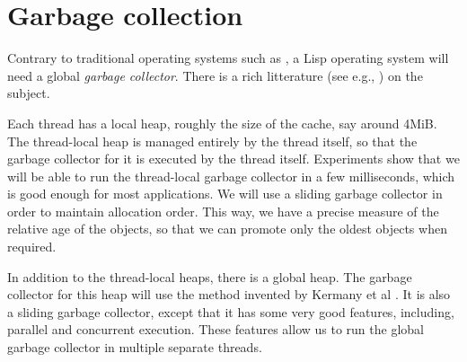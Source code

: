 \chapter{Garbage collection}
\label{chap-garbage-collection}

Contrary to traditional operating systems such as \unix{}, a Lisp
operating system will need a global \emph{garbage collector}.  There 
is a rich litterature (see e.g., \cite{Jones:2011:GCH:2025255}) on the
subject. 

Each thread has a local heap, roughly the size of the cache, say
around 4MiB.  The thread-local heap is managed entirely by the thread
itself, so that the garbage collector for it is executed by the thread
itself.  Experiments show that we will be able to run the thread-local
garbage collector in a few milliseconds, which is good enough for most
applications.  We will use a sliding garbage collector in order to
maintain allocation order.  This way, we have a precise measure of the
relative age of the objects, so that we can promote only the oldest
objects when required. 

In addition to the thread-local heaps, there is a global heap.  The
garbage collector for this heap will use the method invented by
Kermany et al \cite{Kermany:2006:CCI:1133981.1134023}.  It is also a
sliding garbage collector, except that it has some very good features,
including, parallel and concurrent execution.  These features allow us
to run the global garbage collector in multiple separate threads. 


